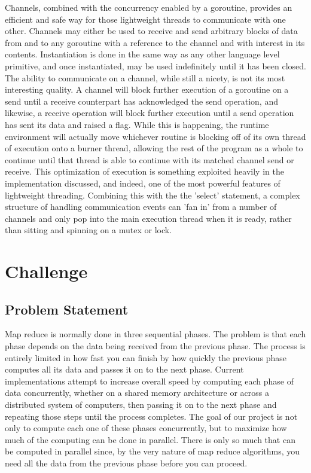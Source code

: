 \documentclass[report]{IEEEtran}
\begin{document}
Channels, combined with the concurrency enabled by a goroutine, provides an efficient and safe way for those lightweight threads to communicate with one other. Channels may either be used to receive and send arbitrary blocks of data from and to any goroutine with a reference to the channel and with interest in its contents. Instantiation is done in the same way as any other language level primitive, and once instantiated, may be used indefinitely until it has been closed. The ability to communicate on a channel, while still a nicety, is not its most interesting quality. A channel will block further execution of a goroutine on a send until a receive counterpart has acknowledged the send operation, and likewise, a receive operation will block further execution until a send operation has sent its data and raised a flag. While this is happening, the runtime environment will actually move whichever routine is blocking off of its own thread of execution onto a burner thread, allowing the rest of the program as a whole to continue until that thread is able to continue with its matched channel send or receive. This optimization of execution is something exploited heavily in the implementation discussed, and indeed, one of the most powerful features of lightweight threading. Combining this with the the 'select' statement, a complex structure of handling communication events can 'fan in' from a number of channels and only pop into the main execution thread when it is ready, rather than sitting and spinning on a mutex or lock.

\section{Challenge}
\subsection{Problem Statement}
Map reduce is normally done in three sequential phases. The problem is that each phase depends on the data being received from the previous phase. The process is entirely limited in how fast you can finish by how quickly the previous phase computes all its data and passes it on to the next phase. Current implementations attempt to increase overall speed by computing each phase of data concurrently, whether on a shared memory architecture or across a distributed system of computers, then passing it on to the next phase and repeating those steps until the process completes. The goal of our project is not only to compute each one of these phases concurrently, but to maximize how much of the computing can be done in parallel. There is only so much that can be computed in parallel since, by the very nature of map reduce algorithms, you need all the data from the previous phase before you can proceed. 
\end{document}

